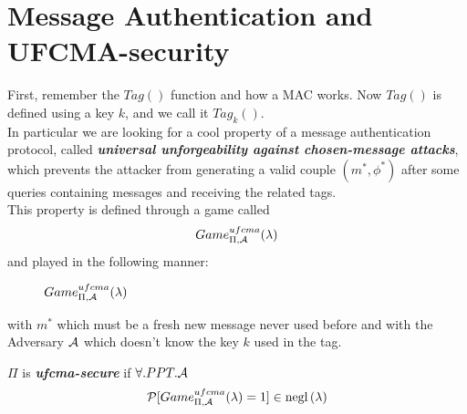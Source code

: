\section{Message Authentication and UFCMA-security}
First, remember the $Tag()$ function and how a MAC works.
Now $Tag()$ is defined using a key $k$, and we call it $Tag_{k}()$.\\
In particular we are looking for a cool property of a message authentication
protocol, called \textbf{ \textit{universal unforgeability against
chosen-message attacks}}, which prevents the attacker from generating a valid
couple $(m^{*}, \phi^{*})$ after some queries containing messages and receiving
the related tags.\\

This property is defined through a game called 
\[
    Game_{\Pi, \mathcal{A}}^{ufcma}(\lambda)
\]
and played in the following manner:

\begin{figure}[h!]
   \centering
   \sdinit{}
   \caption{$Game_{\Pi, \mathcal{A}}^{ufcma}(\lambda)$}
\end{figure}

with $m^{*}$ which must be a fresh new message never used before and with the
Adversary $\mathcal{A}$ which doesn't know the key $k$ used in the tag.\\

\begin{definition}
    $\Pi$ is \textbf{ \textit{ufcma-secure} } if $ \forall.PPT.\mathcal{A}$ 
    \[
        \mathcal{P} [ Game_{\Pi, \mathcal{A}}^{ufcma}(\lambda)=1 ] \in \mathrm{negl}\left({\lambda}\right)  
    \]
\end{definition}

